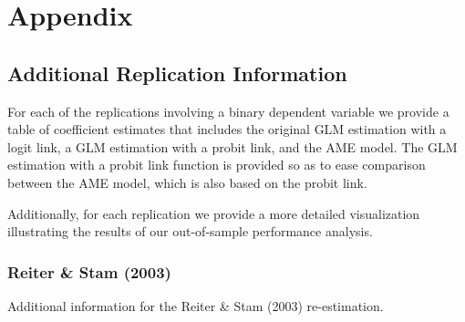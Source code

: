 \clearpage

\renewcommand{\thefigure}{A\arabic{figure}}
\setcounter{figure}{0}
\renewcommand{\thetable}{A.\arabic{table}}
\setcounter{table}{0}
\renewcommand{\thesection}{A.\arabic{section}}
\setcounter{section}{0}

\section*{\textbf{Appendix}}

\subsection*{Additional Replication Information}

For each of the replications involving a binary dependent variable we provide a table of coefficient estimates that includes the original GLM estimation with a logit link, a GLM estimation with a probit link, and the AME model. The GLM estimation with a probit link function is provided so as to ease comparison between the AME model, which is also based on the probit link. %

Additionally, for each replication we provide a more detailed visualization illustrating the results of our out-of-sample performance analysis. %

\clearpage
\subsubsection*{Reiter \& Stam (2003)}

Additional information for the Reiter \& Stam (2003) re-estimation.


\FloatBarrier

\FloatBarrier
\clearpage

